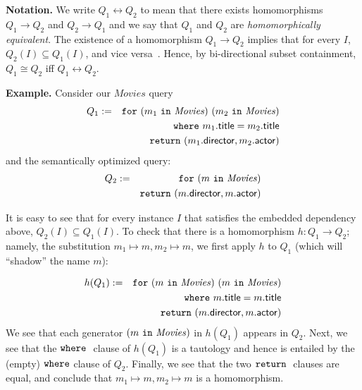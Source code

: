 \documentclass[preprint]{sigplanconf}
\newcommand{\FOR}{{\tt for} \ }
\newcommand{\WHERE}{{\tt where} \ }
\newcommand{\IN}{ \ {\tt in} \ }
\newcommand{\RETURN}{{\tt return} \ }
\newcommand{\greg}[1]{\textcolor{blue}{GREG: #1}}
\newcommand{\relation}[1]{\ensuremath{\mathit{#1}}\xspace}
\begin{document}
{\bf Notation.} We write $Q_1 \leftrightarrow Q_2$ to mean that there exists homomorphisms $Q_1 \to Q_2$ and $Q_2 \to Q_1$ and we say that $Q_1$ and $Q_2$ are {\it homomorphically equivalent}.  The existence of a homomorphism $Q_1 \to Q_2$ implies that for every $I$, $Q_2(I) \subseteq Q_1(I)$, and vice versa~\cite{foundations}.  Hence, by bi-directional subset containment, $Q_1 \cong Q_2$ iff $Q_1 \leftrightarrow Q_2$.

{\bf Example.} Consider our \relation{Movies} query 
\begin{eqnarray*}
Q_1 & := & \FOR (m_1 \IN \relation{Movies}) \ (m_2 \IN \relation{Movies}) \\
 & & \WHERE m_1.{\sf title} = m_2.{\sf title} \\
 & & \RETURN (m_1.{\sf director}, m_2.{\sf actor})
\end{eqnarray*}   
and the semantically optimized query:
\begin{eqnarray*}
Q_2 & := & \FOR (m \IN \relation{Movies}) \\
 & & \RETURN (m.{\sf director}, m.{\sf actor})
\end{eqnarray*}   

It is easy to see that for every instance $I$ that satisfies the embedded dependency above, $Q_2(I) \subseteq Q_1(I)$. 
To check that there is a homomorphism $h : Q_1 \to Q_2$; namely, the substitution $m_1 \mapsto m, m_2 \mapsto m$,
 we first apply $h$ to $Q_1$ (which will ``shadow'' the name $m$):

\begin{eqnarray*}
h(Q_1) & := & \FOR (m \IN \relation{Movies}) \ (m \IN \relation{Movies}) \\
 & & \WHERE m.{\sf title} = m.{\sf title} \\
 & & \RETURN (m.{\sf director}, m.{\sf actor})
\end{eqnarray*}   
We see that each generator $(m \IN \relation{Movies})$ in $h(Q_1)$ appears in $Q_2$.
Next, we see that the $\WHERE$ clause of $h(Q_1)$ is a tautology and hence is entailed by the (empty) ${\tt where}$ clause of $Q_2$.
Finally, we see that the two $\RETURN$ clauses are equal, and conclude that $m_1 \mapsto m, m_2 \mapsto m$ is a homomorphism.
\end{document}
